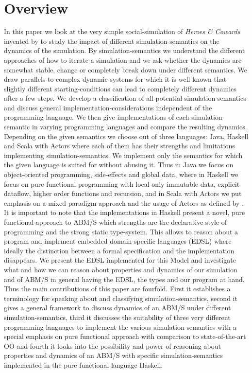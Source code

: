\section{Overview}
In this paper we look at the very simple social-simulation of \textit{Heroes \& Cowards} invented by \cite{wilensky_introduction_2015} to study the impact of different simulation-semantics on the dynamics of the simulation. By simulation-semantics we understand the different approaches of how to iterate a simulation and we ask whether the dynamics are somewhat stable, change or completely break down under different semantics. We draw parallels to complex dynamic systems for which it is well known that slightly different starting-conditions can lead to completely different dynamics after a few steps. We develop a classification of all potential simulation-semantics and discuss general implementation-considerations independent of the programming language. We then give implementations of each simulation-semantic in varying programming languages and compare the resulting dynamics. Depending on the given semantics we choose out of three languages: Java, Haskell and Scala with Actors where each of them has their strengths and limitations implementing simulation-semantics. We implement only the semantics for which the given language is suited for without abusing it. Thus in Java we focus on object-oriented programming, side-effects and global data, where in Haskell we focus on pure functional programming with local-only immutable data, explicit dataflow, higher order functions and recursion, and in Scala with Actors we put emphasis on a mixed-paradigm approach and the usage of Actors as defined by \cite{agha_actors:_1986}. \\
It is important to note that the implementations in Haskell present a novel, pure functional approach to ABM/S which strengths are the declarative style of programming and the strong static type-system. This allows to reason about a program and implement embedded domain-specific languages (EDSL) where ideally the distinction between a formal specification and the implementation disappears. We present the EDSL implemented for this Model and investigate what and how we can reason about properties and dynamics of our simulation and of ABM/S in general having the EDSL, the types and our program at hand. \\
Thus the main contributions of this paper are fourfold. First it establishes a terminology for speaking about and classifying simulation-semantics, second it gives a general framework to discuss dynamics of an ABM/S under different simulation-semantics, third it discusses the suitability of three very different programming-languages to implement the various simulation-semantics with a special emphasis on pure functional approach with comparison to state-of-the-art OO and fourth it looks into the possibility and power of reasoning about properties and dynamics of an ABM/S with specific simulation-semantics implemented in the pure functional language Haskell.